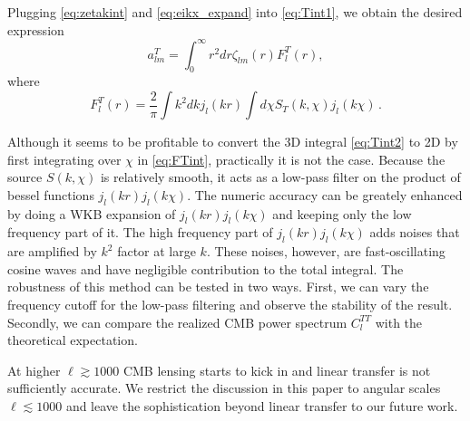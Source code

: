 Plugging \eqref{eq:zetakint} and \eqref{eq:eikx_expand} into \eqref{eq:Tint1}, we obtain the desired expression
\begin{equation}
a_{lm}^T = \int_0^\infty r^2dr \zeta_{lm}(r) F^T_l(r), \label{eq:Tint2}
\end{equation}
where
\begin{equation}
F^T_l(r) = \frac{2}{\pi} \int k^2dk j_l(kr) \int d\chi S_T(k, \chi) j_l(k\chi) \, . \label{eq:FTint}
\end{equation}

Although it seems to be profitable to convert the 3D integral \eqref{eq:Tint2} to 2D by first integrating over $\chi$ in \eqref{eq:FTint}, practically it is not the case. Because the source $S(k, \chi)$ is relatively smooth, it acts as a low-pass filter on the product of bessel functions $j_l(kr)j_l(k\chi)$. The numeric accuracy can be greately enhanced by doing a WKB expansion of $j_l(kr)j_l(k\chi)$ and keeping only the low frequency part of it. The high frequency part of $j_l(kr)j_l(k\chi)$ adds noises that are amplified by $k^2$ factor at large $k$. These noises, however, are fast-oscillating cosine waves and have negligible contribution to the total integral. The robustness of this method can be tested in two ways. First, we can vary the frequency cutoff for the low-pass filtering and observe the stability of the result. Secondly, we can compare the realized CMB power spectrum $C_l^{TT}$ with the theoretical expectation. 

At higher $\ell \gtrsim 1000$ CMB lensing starts to kick in and linear transfer is not sufficiently accurate. We restrict the discussion in this paper to angular scales $\ell \lesssim 1000$ and leave the sophistication beyond linear transfer to our future work.


